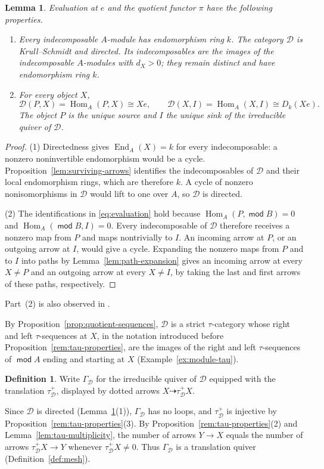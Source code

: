 \documentclass[a4paper,reqno,10pt]{amsart}
\newtheorem{lemma}[theorem]{Lemma}
\theoremstyle{definition}
\newtheorem{definition}[theorem]{Definition}
\numberwithin{equation}{section}
\DeclareMathOperator{\moduleCategory}{\mathsf{mod}}
\renewcommand{\mod}{\moduleCategory}
\DeclareMathOperator{\Hom}{Hom}
\DeclareMathOperator{\End}{End}
\newcommand{\cD}{\mathcal D}
\newcommand{\Dk}{D_k}
\begin{document}
\begin{lemma}\label{lem:evaluation}
Evaluation at \(e\) and the quotient functor \(\pi\) have the following properties.
\begin{enumerate}
\item Every indecomposable \(A\)-module has endomorphism ring \(k\).
The category \(\cD\) is Krull--Schmidt and directed. Its indecomposables
 are the images of the indecomposable \(A\)-modules with \(d_X>0\);
 they remain distinct and have endomorphism ring \(k\).
\item For every object \(X\),
\begin{equation}\label{eq:evaluation}
 \cD(P,X)=\Hom_A(P,X)\cong Xe,\qquad
 \cD(X,I)=\Hom_A(X,I)\cong\Dk(Xe).
\end{equation}
The object \(P\) is the unique source and \(I\) the unique sink of the
irreducible quiver of \(\cD\).
\end{enumerate}
\end{lemma}
\begin{proof}
(1) Directedness gives \(\End_A(X)=k\) for every indecomposable:
a nonzero noninvertible endomorphism would be a cycle.
Proposition~\ref{lem:surviving-arrows} identifies the indecomposables
of \(\cD\) and their local endomorphism rings, which are therefore \(k\).
A cycle of nonzero nonisomorphisms in \(\cD\) would lift to one over
\(A\), so \(\cD\) is directed.

(2) The identifications in \eqref{eq:evaluation} hold because
\(\Hom_A(P,\mod B)=0\) and \(\Hom_A(\mod B,I)=0\).
Every indecomposable of \(\cD\) therefore receives a nonzero map from \(P\) and maps
nontrivially to \(I\). An incoming arrow at \(P\), or an outgoing arrow
at \(I\), would give a cycle. Expanding the nonzero maps from \(P\) and to \(I\)
into paths by Lemma~\ref{lem:path-expansion} gives an incoming arrow at
every \(X\ne P\) and an outgoing arrow at every \(X\ne I\), by taking
the last and first arrows of these paths, respectively.
\end{proof}
Part~(2) is also observed in \cite[Section~10]{RV}.

By Proposition~\ref{prop:quotient-sequences}, \(\cD\) is a strict
\(\tau\)-category whose right and left \(\tau\)-sequences at \(X\), in the
notation introduced before Proposition~\ref{rem:tau-properties}, are the
images of the right and left \(\tau\)-sequences of \(\mod A\) ending and
starting at \(X\) (Example~\ref{ex:module-tau}).
\begin{definition}\label{def:boundary}
Write \(\Gamma_{\cD}\) for the irreducible quiver of \(\cD\) equipped
with the translation \(\tau_{\cD}^+\), displayed by dotted arrows
\(X\dashrightarrow\tau_{\cD}^+X\).
\end{definition}
Since \(\cD\) is directed (Lemma~\ref{lem:evaluation}(1)), \(\Gamma_{\cD}\)
has no loops, and \(\tau_{\cD}^+\) is injective by
Proposition~\ref{rem:tau-properties}(3). By
Proposition~\ref{rem:tau-properties}(2) and
Lemma~\ref{lem:tau-multiplicity}, the number of arrows \(Y\to X\) equals the
number of arrows \(\tau_{\cD}^+X\to Y\) whenever \(\tau_{\cD}^+X\ne0\). Thus
\(\Gamma_{\cD}\) is a translation quiver (Definition~\ref{def:mesh}).
\end{document}
